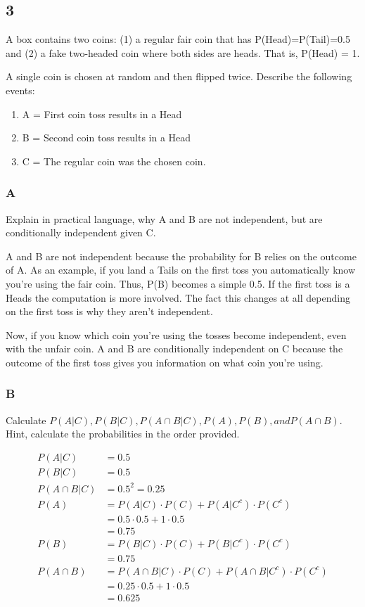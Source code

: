\subsection*{3}

A box contains two coins: (1) a regular fair coin that has P(Head)=P(Tail)=0.5 and (2) a fake two-headed coin where both sides are heads. That is, P(Head) = 1.

A single coin is chosen at random and then flipped twice. Describe the following events:

\begin{enumerate}
	\item A = First coin toss results in a Head
	\item B = Second coin toss results in a Head
	\item C = The regular coin was the chosen coin.
\end{enumerate}

\subsubsection*{A}

Explain in practical language, why A and B are not independent, but are conditionally independent given C.

A and B are not independent because the probability for B relies on the outcome of A. As an example, if you land a Tails on the first toss you automatically know you're using the fair coin. Thus, P(B) becomes a simple 0.5. If the first toss is a Heads the computation is more involved. The fact this changes at all depending on the first toss is why they aren't independent.

Now, if you know which coin you're using the tosses become independent, even with the unfair coin. A and B are conditionally independent on C because the outcome of the first toss gives you information on what coin you're using.

\subsubsection*{B}

Calculate $P(A|C), P(B|C), P(A \cap B | C), P(A), P(B), and P(A \cap B)$. Hint, calculate the probabilities in the order provided.

\begin{align*}
	P(A|C) &= 0.5 \\
	P(B|C) &= 0.5 \\
	P(A \cap B | C) &= 0.5^2= 0.25 \\
	P(A) &= P(A | C) \cdot P(C) + P(A | C^c) \cdot P(C^c) \\
	&= 0.5 \cdot 0.5 + 1 \cdot 0.5 \\
	&= 0.75 \\
	P(B) &= P(B | C) \cdot P(C) + P(B | C^c) \cdot P(C^c) \\
	&= 0.75 \\
	P(A \cap B) &= P(A \cap B | C) \cdot P(C) + P(A \cap B | C^c) \cdot P(C^c) \\
	&= 0.25 \cdot 0.5 + 1 \cdot 0.5 \\
	&= 0.625
\end{align*}



